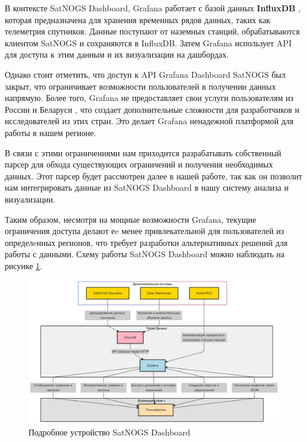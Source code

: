 \documentclass[14pt, a4paper]{bsu}
\begin{document}
В контексте SatNOGS Dashboard, Grafana работает с базой данных
\textbf{InfluxDB} \cite{influxdb_docs}, которая предназначена для хранения
временных рядов данных, таких как телеметрия спутников. Данные поступают от
наземных станций, обрабатываются клиентом SatNOGS и сохраняются в InfluxDB.
Затем Grafana использует API для доступа к этим данным и их визуализации на
дашбордах.

Однако стоит отметить, что доступ к API Grafana Dashboard SatNOGS был закрыт,
что ограничивает возможности пользователей в получении данных напрямую. Более
того, Grafana не предоставляет свои услуги пользователям из России и Беларуси
\cite{grafana_community_post}, что создает дополнительные сложности для
разработчиков и исследователей из этих стран. Это делает Grafana ненадежной
платформой для работы в нашем регионе.

В связи с этими ограничениями нам приходится разрабатывать собственный парсер
для обхода существующих ограничений и получения необходимых данных. Этот
парсер будет рассмотрен далее в нашей работе, так как он позволит нам
интегрировать данные из SatNOGS Dashboard в нашу систему анализа и
визуализации.

Таким образом, несмотря на мощные возможности Grafana, текущие ограничения
доступа делают еe менее привлекательной для пользователей из определeнных
регионов, что требует разработки альтернативных решений для работы с данными.
Схему работы SatNOGS Dashboard можно наблюдать на рисунке
\ref{fig:grafana_infra}.

\begin{figure}[htbp] \centering
	\includegraphics[width=1.0\textwidth]{grafana_infra} \caption{Подробное
		устройство SatNOGS Dashboard} \label{fig:grafana_infra} \end{figure}
\end{document}
